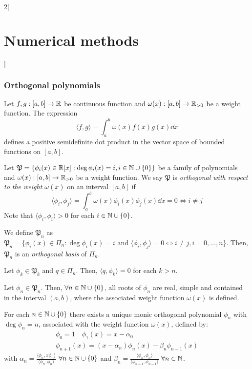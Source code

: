 \documentclass[../../../main.tex]{subfiles}
\begin{document}
\begin{multicols}{2}[\section{Numerical methods}]
  \subsubsection{Orthogonal polynomials}
  \begin{definition}
    Let $f,g:[a,b]\rightarrow\mathbb{R}$ be continuous function and $\omega(x):[a,b]\rightarrow\mathbb{R}_{>0}$ be a weight function. The expression $$\langle f,g\rangle=\int_a^b\omega(x)f(x)g(x)\dd{x}$$ defines a positive semidefinite dot product in the vector space of bounded functions on $[a,b]$.
  \end{definition}
  \begin{definition}
    Let $\mathfrak{P}=\{\phi_i(x)\in\mathbb{R}[x]:\deg \phi_i(x)=i, i\in\mathbb{N}\cup\{0\}\}$ be a family of polynomials and $\omega(x):[a,b]\rightarrow\mathbb{R}_{>0}$ be a weight function. We say $\mathfrak{P}$ is \emph{orthogonal with respect to the weight $\omega(x)$} on an interval $[a,b]$ if $$\langle \phi_i,\phi_j\rangle=\int_a^b\omega(x)\phi_i(x)\phi_j(x)\dd{x}=0\iff i\ne j$$
    Note that $\langle \phi_i,\phi_i\rangle>0$ for each $i\in\mathbb{N}\cup\{0\}$.
  \end{definition}
  \begin{lemma}
    We define $\mathfrak{P}_n$ as $\mathfrak{P}_n=\{\phi_i(x)\in\Pi_n:\deg\phi_i(x)=i\text{ and }\langle \phi_i,\phi_j\rangle=0\iff i\ne j,  i=0,\ldots,n\}$. Then, $\mathfrak{P}_n$ is an \emph{orthogonal basis} of $\Pi_n$.
  \end{lemma}
  \begin{lemma}
    Let $\phi_k\in\mathfrak{P}_k$ and $q\in\Pi_n$. Then, $\langle q,\phi_k\rangle=0$ for each $k>n$.
  \end{lemma}
  \begin{lemma}
    Let $\phi_n\in\mathfrak{P}_n$. Then, $\forall n\in\mathbb{N}\cup\{0\}$, all roots of $\phi_n$ are real, simple and contained in the interval $(a,b)$, where the associated weight function $\omega(x)$ is defined.
  \end{lemma}
  \begin{theorem}
    For each $n\in\mathbb{N}\cup\{0\}$ there exists a unique monic orthogonal polynomial $\phi_n$ with $\deg\phi_n=n$, associated with the weight function $\omega(x)$, defined by:
    \begin{gather*}
      \phi_0=1\quad\phi_1(x)=x-\alpha_0\\
      \phi_{n+1}(x)=(x-\alpha_n)\phi_n(x)-\beta_n\phi_{n-1}(x)
    \end{gather*}
    with $\alpha_n=\frac{\langle\phi_n,x\phi_n\rangle}{\langle\phi_n,\phi_n\rangle}$ $\forall n\in\mathbb{N}\cup\{0\}$ and $\beta_n=\frac{\langle\phi_n,\phi_n\rangle}{\langle\phi_{n-1},\phi_{n-1}\rangle}$ $\forall n\in\mathbb{N}$.

\end{theorem}
\end{multicols}
\end{document}
